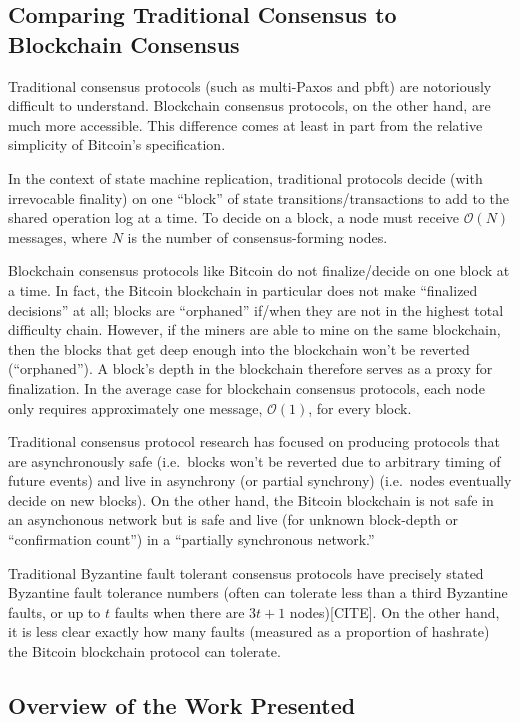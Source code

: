\documentclass{article}
\theoremstyle{definition}
\begin{document}
\subsection{Comparing Traditional Consensus to Blockchain Consensus}

Traditional consensus protocols (such as multi-Paxos and pbft) are notoriously difficult to understand\cite{paxos}. Blockchain consensus protocols, on the other hand, are much more accessible. This difference comes at least in part from the relative simplicity of Bitcoin's specification.

In the context of state machine replication, traditional protocols decide (with irrevocable finality) on one ``block'' of state transitions/transactions to add to the shared operation log at a time. To decide on a block, a node must receive $\mathcal{O}(N)$ messages, where $N$ is the number of consensus-forming nodes.

Blockchain consensus protocols like Bitcoin do not finalize/decide on one block at a time. In fact, the Bitcoin blockchain in particular does not make ``finalized decisions'' at all; blocks are ``orphaned'' if/when they are not in the highest total difficulty chain. However, if the miners are able to mine on the same blockchain, then the blocks that get deep enough into the blockchain won't be reverted (``orphaned''). A block's depth in the blockchain therefore serves as a proxy for finalization. In the average case for blockchain consensus protocols, each node only requires approximately one message, $\mathcal{O}(1)$, for every block.

Traditional consensus protocol research has focused on producing protocols that are asynchronously safe (i.e.\ blocks won't be reverted due to arbitrary timing of future events) and live in asynchrony (or partial synchrony) (i.e.\ nodes eventually decide on new blocks). On the other hand, the Bitcoin blockchain is not safe in an asynchonous network but is safe and live (for unknown block-depth or ``confirmation count'') in a ``partially synchronous network.''

Traditional Byzantine fault tolerant consensus protocols have precisely stated Byzantine fault tolerance numbers (often can tolerate less than a third Byzantine faults, or up to $t$ faults when there are $3t + 1$ nodes)[CITE]. On the other hand, it is less clear exactly how many faults (measured as a proportion of hashrate) the Bitcoin blockchain protocol can tolerate.

\subsection{Overview of the Work Presented}
\end{document}
